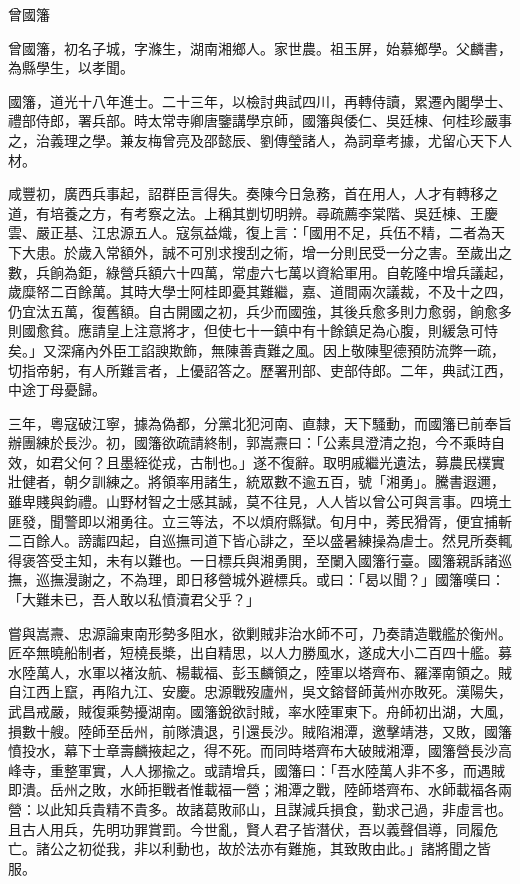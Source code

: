 
\begin{pinyinscope}
曾國籓

曾國籓，初名子城，字滌生，湖南湘鄉人。家世農。祖玉屏，始慕鄉學。父麟書，為縣學生，以孝聞。

國籓，道光十八年進士。二十三年，以檢討典試四川，再轉侍讀，累遷內閣學士、禮部侍郎，署兵部。時太常寺卿唐鑒講學京師，國籓與倭仁、吳廷棟、何桂珍嚴事之，治義理之學。兼友梅曾亮及邵懿辰、劉傳瑩諸人，為詞章考據，尤留心天下人材。

咸豐初，廣西兵事起，詔群臣言得失。奏陳今日急務，首在用人，人才有轉移之道，有培養之方，有考察之法。上稱其剴切明辨。尋疏薦李棠階、吳廷棟、王慶雲、嚴正基、江忠源五人。寇氛益熾，復上言：「國用不足，兵伍不精，二者為天下大患。於歲入常額外，誠不可別求搜刮之術，增一分則民受一分之害。至歲出之數，兵餉為鉅，綠營兵額六十四萬，常虛六七萬以資給軍用。自乾隆中增兵議起，歲糜帑二百餘萬。其時大學士阿桂即憂其難繼，嘉、道間兩次議裁，不及十之四，仍宜汰五萬，復舊額。自古開國之初，兵少而國強，其後兵愈多則力愈弱，餉愈多則國愈貧。應請皇上注意將才，但使七十一鎮中有十餘鎮足為心腹，則緩急可恃矣。」又深痛內外臣工諂諛欺飾，無陳善責難之風。因上敬陳聖德預防流弊一疏，切指帝躬，有人所難言者，上優詔答之。歷署刑部、吏部侍郎。二年，典試江西，中途丁母憂歸。

三年，粵寇破江寧，據為偽都，分黨北犯河南、直隸，天下騷動，而國籓已前奉旨辦團練於長沙。初，國籓欲疏請終制，郭嵩燾曰：「公素具澄清之抱，今不乘時自效，如君父何？且墨絰從戎，古制也。」遂不復辭。取明戚繼光遺法，募農民樸實壯健者，朝夕訓練之。將領率用諸生，統眾數不逾五百，號「湘勇」。騰書遐邇，雖卑賤與鈞禮。山野材智之士感其誠，莫不往見，人人皆以曾公可與言事。四境土匪發，聞警即以湘勇往。立三等法，不以煩府縣獄。旬月中，莠民猾胥，便宜捕斬二百餘人。謗讟四起，自巡撫司道下皆心誹之，至以盛暑練操為虐士。然見所奏輒得褒答受主知，未有以難也。一日標兵與湘勇閧，至闌入國籓行臺。國籓親訴諸巡撫，巡撫漫謝之，不為理，即日移營城外避標兵。或曰：「曷以聞？」國籓嘆曰：「大難未已，吾人敢以私憤瀆君父乎？」

嘗與嵩燾、忠源論東南形勢多阻水，欲剿賊非治水師不可，乃奏請造戰艦於衡州。匠卒無曉船制者，短橈長槳，出自精思，以人力勝風水，遂成大小二百四十艦。募水陸萬人，水軍以褚汝航、楊載福、彭玉麟領之，陸軍以塔齊布、羅澤南領之。賊自江西上竄，再陷九江、安慶。忠源戰歿廬州，吳文鎔督師黃州亦敗死。漢陽失，武昌戒嚴，賊復乘勢擾湖南。國籓銳欲討賊，率水陸軍東下。舟師初出湖，大風，損數十艘。陸師至岳州，前隊潰退，引還長沙。賊陷湘潭，邀擊靖港，又敗，國籓憤投水，幕下士章壽麟掖起之，得不死。而同時塔齊布大破賊湘潭，國籓營長沙高峰寺，重整軍實，人人捓揄之。或請增兵，國籓曰：「吾水陸萬人非不多，而遇賊即潰。岳州之敗，水師拒戰者惟載福一營；湘潭之戰，陸師塔齊布、水師載福各兩營：以此知兵貴精不貴多。故諸葛敗祁山，且謀減兵損食，勤求己過，非虛言也。且古人用兵，先明功罪賞罰。今世亂，賢人君子皆潛伏，吾以義聲倡導，同履危亡。諸公之初從我，非以利動也，故於法亦有難施，其致敗由此。」諸將聞之皆服。


\end{pinyinscope}
